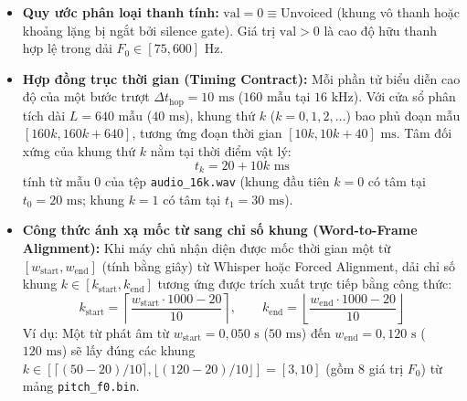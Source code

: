 \documentclass[11pt,a4paper]{article}
\begin{document}
\begin{itemize}
    \textit{Ví dụ giải mã:} Một khung có $F_0 = 440{,}137\text{ Hz}$, giá trị ghi vào tệp là:
    \[
    \text{val} = \text{round}(440{,}137 \times 16) = \text{round}(7042{,}192) = 7042 \equiv \texttt{0x1B82}
    \]
    Khi máy chủ đọc ra: $7042 / 16 = 440{,}125\text{ Hz}$. Độ lệch tần số là $|\Delta F_0| = 0{,}012\text{ Hz}$, quy đổi sang đơn vị cent âm học:
    \[
    \Delta_{\text{cent}} = 1200 \times \log_2\left(\frac{440{,}125}{440{,}137}\right) \approx \mathbf{-0{,}047\text{ cent}} \ll 1\text{ cent}
    \]
    hoàn toàn triệt tiêu sai số lượng tử hóa nhị phân đối với thính giác người.
    \item \textbf{Quy ước phân loại thanh tính:} $\text{val} = 0 \equiv \text{Unvoiced}$ (khung vô thanh hoặc khoảng lặng bị ngắt bởi silence gate). Giá trị $\text{val} > 0$ là cao độ hữu thanh hợp lệ trong dải $F_0 \in [75, 600]\text{ Hz}$.
    \item \textbf{Hợp đồng trục thời gian (Timing Contract):} Mỗi phần tử biểu diễn cao độ của một bước trượt $\Delta t_{\text{hop}} = 10\text{ ms}$ ($160\text{ mẫu}$ tại $16\text{ kHz}$). Với cửa sổ phân tích dài $L = 640\text{ mẫu}$ ($40\text{ ms}$), khung thứ $k$ ($k = 0, 1, 2, \dots$) bao phủ đoạn mẫu $[160k, 160k + 640]$, tương ứng đoạn thời gian $[10k, 10k + 40]\text{ ms}$. Tâm đối xứng của khung thứ $k$ nằm tại thời điểm vật lý:
    \begin{equation}
    t_k = 20 + 10k\text{ ms}
    \label{eq:frame_center_timestamp}
    \end{equation}
    tính từ mẫu 0 của tệp \texttt{audio\_16k.wav} (khung đầu tiên $k = 0$ có tâm tại $t_0 = 20\text{ ms}$; khung $k = 1$ có tâm tại $t_1 = 30\text{ ms}$).
    \item \textbf{Công thức ánh xạ mốc từ sang chỉ số khung (Word-to-Frame Alignment):} Khi máy chủ nhận diện được mốc thời gian một từ $[w_{\text{start}}, w_{\text{end}}]$ (tính bằng giây) từ Whisper hoặc Forced Alignment, dải chỉ số khung $k \in [k_{\text{start}}, k_{\text{end}}]$ tương ứng được trích xuất trực tiếp bằng công thức:
    \begin{equation}
    k_{\text{start}} = \left\lceil \frac{w_{\text{start}} \cdot 1000 - 20}{10} \right\rceil, \qquad k_{\text{end}} = \left\lfloor \frac{w_{\text{end}} \cdot 1000 - 20}{10} \right\rfloor
    \label{eq:word_to_frame_formula}
    \end{equation}
    Ví dụ: Một từ phát âm từ $w_{\text{start}} = 0{,}050\text{ s}$ ($50\text{ ms}$) đến $w_{\text{end}} = 0{,}120\text{ s}$ ($120\text{ ms}$) sẽ lấy đúng các khung $k \in [\lceil (50-20)/10 \rceil, \lfloor (120-20)/10 \rfloor] = [3, 10]$ (gồm 8 giá trị $F_0$) từ mảng \texttt{pitch\_f0.bin}.
\end{itemize}
\end{document}
